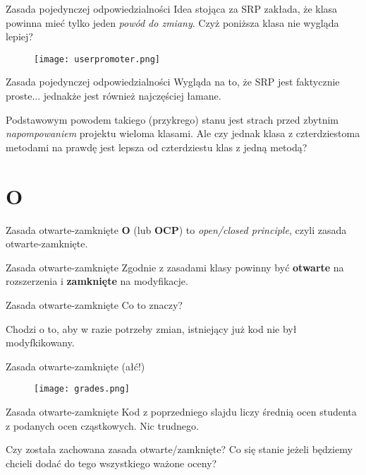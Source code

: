 \begin{frame}{Zasada pojedynczej odpowiedzialności}
	Idea stojąca za SRP zakłada, że klasa powinna mieć tylko jeden \emph{powód do zmiany}. Czyż poniższa klasa nie wygląda lepiej?
	
	\begin{figure}
		\centering
		\texttt{[image: userpromoter.png]}
	\end{figure}
\end{frame}

\begin{frame}{Zasada pojedynczej odpowiedzialności}
	Wygląda na to, że SRP jest faktycznie proste... jednakże jest również najczęściej łamane. 
	
	Podstawowym powodem takiego (przykrego) stanu jest strach przed zbytnim \emph{napompowaniem} projektu wieloma klasami. Ale czy jednak klasa z czterdziestoma metodami na prawdę jest lepsza od czterdziestu klas z jedną metodą?
\end{frame}

\section{O}

\begin{frame}{Zasada otwarte-zamknięte}
	\textbf{O} (lub \textbf{OCP}) to \emph{open/closed principle}, czyli zasada otwarte-zamknięte.
\end{frame}

\begin{frame}{Zasada otwarte-zamknięte}
	Zgodnie z zasadami klasy powinny być \textbf{otwarte} na rozszerzenia i \textbf{zamknięte} na modyfikacje.
\end{frame}

\begin{frame}{Zasada otwarte-zamknięte}
	Co to znaczy?
	
	Chodzi o to, aby w razie potrzeby zmian, istniejący już kod nie był modyfkikowany.
\end{frame}

\begin{frame}{Zasada otwarte-zamknięte (ałć!)}
	\begin{figure} \centering
		\texttt{[image: grades.png]}
	\end{figure}
\end{frame}

\begin{frame}{Zasada otwarte-zamknięte}
	Kod z poprzedniego slajdu liczy średnią ocen studenta z podanych ocen cząstkowych. Nic trudnego.
	
	Czy została zachowana zasada otwarte/zamknięte? Co się stanie jeżeli będziemy chcieli dodać do tego wszystkiego ważone oceny?
\end{frame}

